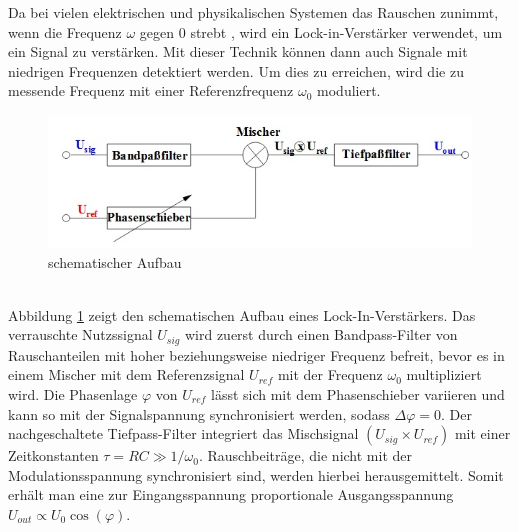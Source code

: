 Da bei vielen elektrischen und physikalischen Systemen das Rauschen zunimmt, wenn
die Frequenz $\omega$ gegen 0 strebt \cite{enet}, wird ein Lock-in-Verstärker
verwendet, um ein Signal zu verstärken. Mit dieser Technik können dann auch
Signale mit niedrigen Frequenzen detektiert werden. Um dies zu erreichen, wird die
zu messende Frequenz mit einer Referenzfrequenz $\omega_0$ moduliert. \\
\begin{figure}[h]
  \includegraphics{Bilder/Schema.jpg}
  \caption{schematischer Aufbau}
  \label{fig:schema}
\end{figure} \\
Abbildung \ref{fig:schema} zeigt den schematischen Aufbau eines Lock-In-Verstärkers.
Das verrauschte Nutzssignal $U_{sig}$ wird zuerst durch einen Bandpass-Filter
von Rauschanteilen mit hoher beziehungsweise niedriger Frequenz befreit, bevor
es in einem Mischer mit dem Referenzsignal $U_{ref}$ mit der Frequenz $\omega_0$
multipliziert wird. Die Phasenlage $\varphi$ von $U_{ref}$ lässt sich mit dem
Phasenschieber variieren und kann so mit der Signalspannung synchronisiert werden,
sodass $\Delta\varphi =0$.
Der nachgeschaltete Tiefpass-Filter integriert das Mischsignal $(U_{sig}\times U_{ref})$
mit einer Zeitkonstanten $\tau = RC \gg 1/\omega_0$.
Rauschbeiträge, die nicht mit der Modulationsspannung synchronisiert sind, werden
hierbei herausgemittelt. Somit erhält man eine zur Eingangsspannung proportionale
Ausgangsspannung $U_{out} \propto U_0 \cos(\varphi)$.

